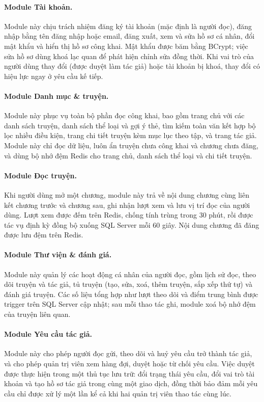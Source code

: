 \paragraph{Module Tài khoản.} Module này chịu trách nhiệm đăng ký tài khoản (mặc định là người đọc), đăng nhập bằng tên đăng nhập hoặc email, đăng xuất, xem và sửa hồ sơ cá nhân, đổi mật khẩu và hiển thị hồ sơ công khai. Mật khẩu được băm bằng BCrypt; việc sửa hồ sơ dùng khoá lạc quan để phát hiện chỉnh sửa đồng thời. Khi vai trò của người dùng thay đổi (được duyệt làm tác giả) hoặc tài khoản bị khoá, thay đổi có hiệu lực ngay ở yêu cầu kế tiếp.

\paragraph{Module Danh mục \& truyện.} Module này phục vụ toàn bộ phần đọc công khai, bao gồm trang chủ với các danh sách truyện, danh sách thể loại và gợi ý thẻ, tìm kiếm toàn văn kết hợp bộ lọc nhiều điều kiện, trang chi tiết truyện kèm mục lục theo tập, và trang tác giả. Module này chỉ đọc dữ liệu, luôn ẩn truyện chưa công khai và chương chưa đăng, và dùng bộ nhớ đệm Redis cho trang chủ, danh sách thể loại và chi tiết truyện.

\paragraph{Module Đọc truyện.} Khi người dùng mở một chương, module này trả về nội dung chương cùng liên kết chương trước và chương sau, ghi nhận lượt xem và lưu vị trí đọc của người dùng. Lượt xem được đếm trên Redis, chống tính trùng trong 30 phút, rồi được tác vụ định kỳ đồng bộ xuống SQL Server mỗi 60 giây. Nội dung chương đã đăng được lưu đệm trên Redis.

\paragraph{Module Thư viện \& đánh giá.} Module này quản lý các hoạt động cá nhân của người đọc, gồm lịch sử đọc, theo dõi truyện và tác giả, tủ truyện (tạo, sửa, xoá, thêm truyện, sắp xếp thứ tự) và đánh giá truyện. Các số liệu tổng hợp như lượt theo dõi và điểm trung bình được trigger trên SQL Server cập nhật; sau mỗi thao tác ghi, module xoá bộ nhớ đệm của truyện liên quan.

\paragraph{Module Yêu cầu tác giả.} Module này cho phép người đọc gửi, theo dõi và huỷ yêu cầu trở thành tác giả, và cho phép quản trị viên xem hàng đợi, duyệt hoặc từ chối yêu cầu. Việc duyệt được thực hiện trong một thủ tục lưu trữ: đổi trạng thái yêu cầu, đổi vai trò tài khoản và tạo hồ sơ tác giả trong cùng một giao dịch, đồng thời bảo đảm mỗi yêu cầu chỉ được xử lý một lần kể cả khi hai quản trị viên thao tác cùng lúc.

